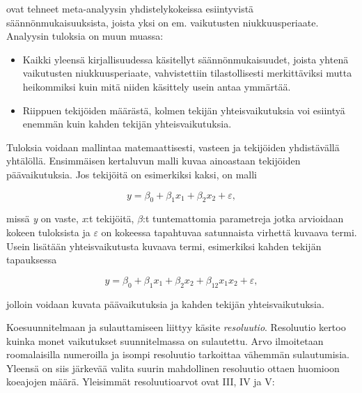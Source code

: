 \documentclass[12pt,a4paper,finnish]{tutthesis}
\begin{document}
\textcite{Li2006} ovat tehneet meta-analyysin yhdistelykokeissa esiintyvistä
säännönmukaisuuksista, joista yksi on em. vaikutusten niukkuusperiaate.
Analyysin tuloksia on muun muassa:

\begin{itemize}
\item Kaikki yleensä kirjallisuudessa käsitellyt säännönmukaisuudet, joista yhtenä
    vaikutusten niukkuusperiaate, vahvistettiin tilastollisesti merkittäviksi mutta
    heikommiksi kuin mitä niiden käsittely usein antaa ymmärtää.
\item Riippuen tekijöiden määrästä, kolmen tekijän yhteisvaikutuksia voi esiintyä
    enemmän kuin kahden tekijän yhteisvaikutuksia.
\end{itemize}

Tuloksia voidaan mallintaa matemaattisesti, vasteen ja tekijöiden yhdistävällä
yhtälöllä. Ensimmäisen kertaluvun malli kuvaa ainoastaan tekijöiden päävaikutuksia.
Jos tekijöitä on esimerkiksi kaksi, on malli

\begin{equation}
  \label{eq:1krtluku}
 y = \beta _0 + \beta _{1}x_1 + \beta _{2}x_2 + \varepsilon,
\end{equation}

missä \textit{y} on vaste, \textit{x}:t tekijöitä, $\beta $:t tuntemattomia parametreja
jotka arvioidaan kokeen tuloksista ja $\varepsilon $ on
kokeessa tapahtuvaa satunnaista virhettä kuvaava termi.
Usein lisätään yhteisvaikutusta kuvaava termi, esimerkiksi kahden tekijän tapauksessa

\begin{equation}
  \label{eq:2krtluku}
 y = \beta _0 + \beta _{1}x_1 + \beta _{2}x_2 + \beta _{12}x_{1}x_{2} + \varepsilon,
\end{equation}

jolloin voidaan kuvata päävaikutuksia ja kahden tekijän yhteisvaikutuksia.



Koesuunnitelmaan ja sulauttamiseen liittyy käsite \textit{resoluutio}. Resoluutio
kertoo kuinka monet vaikutukset suunnitelmassa on sulautettu. Arvo ilmoitetaan
roomalaisilla numeroilla ja isompi resoluutio tarkoittaa vähemmän sulautumisia.
Yleensä on siis järkevää valita suurin mahdollinen resoluutio ottaen huomioon
koeajojen määrä. Yleisimmät resoluutioarvot ovat III, IV ja V:
\end{document}

